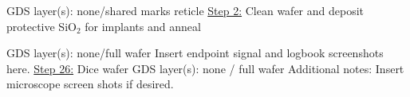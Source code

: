 \documentclass{scrartcl}
\begin{document}
\vspace{0.5em}
GDS layer(s): none/shared marks reticle
%
\newpage
\noindent \underline{Step 2:} Clean wafer and deposit protective SiO$_2$ for implants and anneal

\vspace{0.5em}
GDS layer(s): none/full wafer
%
%
\noindent Insert endpoint signal and logbook screenshots here.
\newpage
\noindent \underline{Step 26:} Dice wafer
\vspace{0.5em} \newline
GDS layer(s): none / full wafer
%
\vspace{1em}
\noindent Additional notes: Insert microscope screen shots if desired. 

\end{document}
